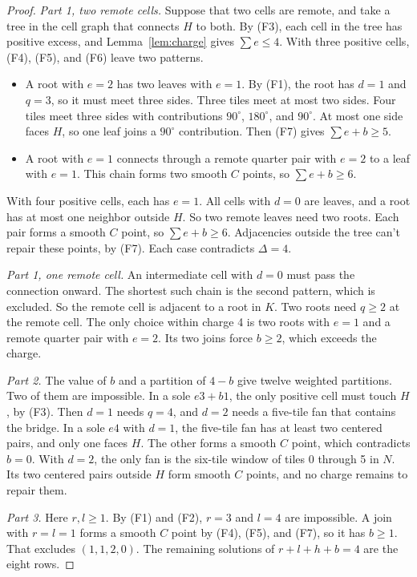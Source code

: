 \documentclass[11pt]{article}
\theoremstyle{remark}
\begin{document}
\begin{proof}
\emph{Part 1, two remote cells.} Suppose that two cells are remote, and take a tree in the cell graph that connects $H$ to both. By (F3), each cell in the tree has positive excess, and Lemma~\ref{lem:charge} gives $\sum e\le4$. With three positive cells, (F4), (F5), and (F6) leave two patterns.
\begin{itemize}
\item A root with $e=2$ has two leaves with $e=1$. By (F1), the root has $d=1$ and $q=3$, so it must meet three sides. Three tiles meet at most two sides. Four tiles meet three sides with contributions $90^\circ$, $180^\circ$, and $90^\circ$. At most one side faces $H$, so one leaf joins a $90^\circ$ contribution. Then (F7) gives $\sum e+b\ge5$.
\item A root with $e=1$ connects through a remote quarter pair with $e=2$ to a leaf with $e=1$. This chain forms two smooth $C$ points, so $\sum e+b\ge6$.
\end{itemize}
With four positive cells, each has $e=1$. All cells with $d=0$ are leaves, and a root has at most one neighbor outside $H$. So two remote leaves need two roots. Each pair forms a smooth $C$ point, so $\sum e+b\ge6$. Adjacencies outside the tree can't repair these points, by (F7). Each case contradicts $\Delta=4$.

\emph{Part 1, one remote cell.} An intermediate cell with $d=0$ must pass the connection onward. The shortest such chain is the second pattern, which is excluded. So the remote cell is adjacent to a root in $K$. Two roots need $q\ge2$ at the remote cell. The only choice within charge 4 is two roots with $e=1$ and a remote quarter pair with $e=2$. Its two joins force $b\ge2$, which exceeds the charge.

\emph{Part 2.} The value of $b$ and a partition of $4-b$ give twelve weighted partitions. Two of them are impossible. In a sole $e3{+}b1$, the only positive cell must touch $H$, by (F3). Then $d=1$ needs $q=4$, and $d=2$ needs a five-tile fan that contains the bridge. In a sole $e4$ with $d=1$, the five-tile fan has at least two centered pairs, and only one faces $H$. The other forms a smooth $C$ point, which contradicts $b=0$. With $d=2$, the only fan is the six-tile window of tiles 0 through 5 in $N$. Its two centered pairs outside $H$ form smooth $C$ points, and no charge remains to repair them.

\emph{Part 3.} Here $r,l\ge1$. By (F1) and (F2), $r=3$ and $l=4$ are impossible. A join with $r=l=1$ forms a smooth $C$ point by (F4), (F5), and (F7), so it has $b\ge1$. That excludes $(1,1,2,0)$. The remaining solutions of $r+l+h+b=4$ are the eight rows.
\end{proof}
\end{document}
